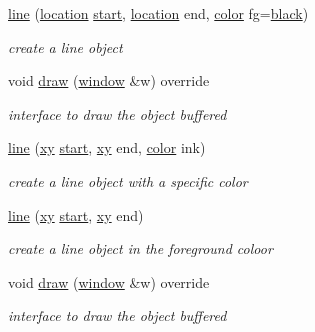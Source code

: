 \begin{DoxyCompactItemize}
\item 
\mbox{\label{classhwlib_1_1line_a2d016ff29a2b0c6db2976651fbd40c8d}} 
\hyperlink{classhwlib_1_1line_a2d016ff29a2b0c6db2976651fbd40c8d}{line} (\hyperlink{classhwlib_1_1location}{location} \hyperlink{classhwlib_1_1drawable_a6c31bc9303840a4317d3c95250c357ce}{start}, \hyperlink{classhwlib_1_1location}{location} end, \hyperlink{classhwlib_1_1color}{color} fg=\hyperlink{namespacehwlib_aa9c056fa29bc9af9f55d4b774bb3898a}{black})
\begin{DoxyCompactList}\small\item\em create a line object \end{DoxyCompactList}\item 
void \hyperlink{classhwlib_1_1line_a0a30c7c7e88377aada5ee1ec422bfc84}{draw} (\hyperlink{classhwlib_1_1window}{window} \&w) override
\begin{DoxyCompactList}\small\item\em interface to draw the object buffered \end{DoxyCompactList}\item 
\mbox{\label{classhwlib_1_1line_a41eac54e1f9015e2baf012e102cdb237}} 
\hyperlink{classhwlib_1_1line_a41eac54e1f9015e2baf012e102cdb237}{line} (\hyperlink{classhwlib_1_1xy}{xy} \hyperlink{classhwlib_1_1drawable_a6c31bc9303840a4317d3c95250c357ce}{start}, \hyperlink{classhwlib_1_1xy}{xy} end, \hyperlink{classhwlib_1_1color}{color} ink)
\begin{DoxyCompactList}\small\item\em create a line object with a specific color \end{DoxyCompactList}\item 
\mbox{\label{classhwlib_1_1line_a424a06dd54cd7cdc9c27c92c7e89e5f2}} 
\hyperlink{classhwlib_1_1line_a424a06dd54cd7cdc9c27c92c7e89e5f2}{line} (\hyperlink{classhwlib_1_1xy}{xy} \hyperlink{classhwlib_1_1drawable_a6c31bc9303840a4317d3c95250c357ce}{start}, \hyperlink{classhwlib_1_1xy}{xy} end)
\begin{DoxyCompactList}\small\item\em create a line object in the foreground coloor \end{DoxyCompactList}\item 
void \hyperlink{classhwlib_1_1line_a0a30c7c7e88377aada5ee1ec422bfc84}{draw} (\hyperlink{classhwlib_1_1window}{window} \&w) override
\begin{DoxyCompactList}\small\item\em interface to draw the object buffered \end{DoxyCompactList}\end{DoxyCompactItemize}
